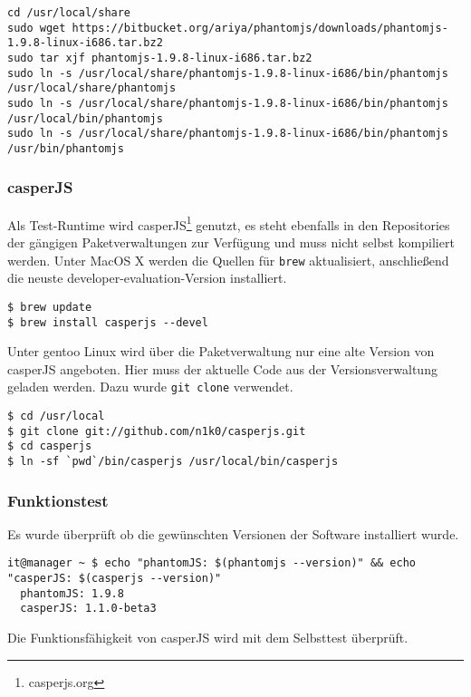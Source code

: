 \begin{verbatim}
cd /usr/local/share
sudo wget https://bitbucket.org/ariya/phantomjs/downloads/phantomjs-1.9.8-linux-i686.tar.bz2
sudo tar xjf phantomjs-1.9.8-linux-i686.tar.bz2
sudo ln -s /usr/local/share/phantomjs-1.9.8-linux-i686/bin/phantomjs /usr/local/share/phantomjs
sudo ln -s /usr/local/share/phantomjs-1.9.8-linux-i686/bin/phantomjs /usr/local/bin/phantomjs
sudo ln -s /usr/local/share/phantomjs-1.9.8-linux-i686/bin/phantomjs /usr/bin/phantomjs
\end{verbatim}

\subsubsection*{casperJS}\label{casperjs}

Als Test-Runtime wird casperJS\footnote{casperjs.org} genutzt, es steht
ebenfalls in den Repositories der gängigen Paketverwaltungen zur
Verfügung und muss nicht selbst kompiliert werden. Unter MacOS X werden
die Quellen für \texttt{brew} aktualisiert, anschließend die neuste
developer-evaluation-Version installiert.

\begin{verbatim}
$ brew update
$ brew install casperjs --devel
\end{verbatim}

Unter gentoo Linux wird über die Paketverwaltung nur eine alte Version
von casperJS angeboten. Hier muss der aktuelle Code aus der
Versionsverwaltung geladen werden. Dazu wurde \texttt{git clone}
verwendet.

\begin{verbatim}
$ cd /usr/local
$ git clone git://github.com/n1k0/casperjs.git
$ cd casperjs
$ ln -sf `pwd`/bin/casperjs /usr/local/bin/casperjs
\end{verbatim}

\subsubsection*{Funktionstest}\label{funktionstest}

Es wurde überprüft ob die gewünschten Versionen der Software installiert
wurde.

\begin{verbatim}
it@manager ~ $ echo "phantomJS: $(phantomjs --version)" && echo "casperJS: $(casperjs --version)"
  phantomJS: 1.9.8
  casperJS: 1.1.0-beta3
\end{verbatim}

Die Funktionsfähigkeit von casperJS wird mit dem Selbsttest überprüft.


